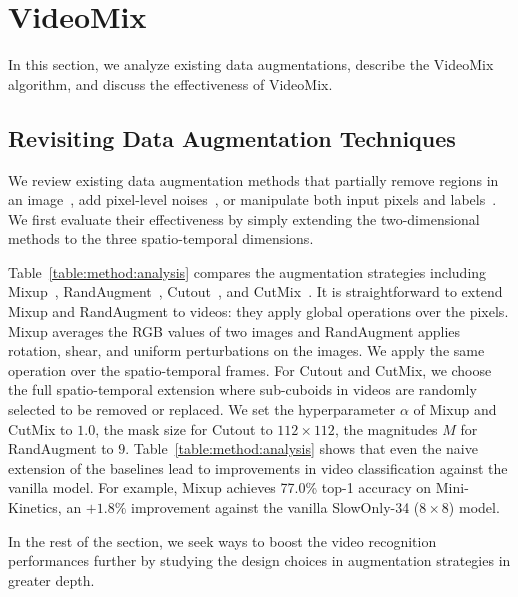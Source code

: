 \section{VideoMix}
\label{section:videomix}

In this section, we analyze existing data augmentations, describe the VideoMix algorithm, and discuss the effectiveness of VideoMix. 

\subsection{Revisiting Data Augmentation Techniques}



We review existing data augmentation methods that partially remove regions in an image~\cite{devries2017cutout}, add pixel-level noises~\cite{autoaugment,randaugment}, or manipulate both input pixels and labels~\cite{zhang2017mixup,cutmix}.
We first evaluate their effectiveness by simply extending the two-dimensional methods to the three spatio-temporal dimensions.

Table~\ref{table:method:analysis} compares the augmentation strategies including Mixup~\cite{zhang2017mixup}, RandAugment~\cite{randaugment}, Cutout~\cite{devries2017cutout}, and CutMix~\cite{cutmix}.
It is straightforward to extend Mixup and RandAugment to videos: they apply global operations over the pixels. Mixup averages the RGB values of two images and RandAugment applies rotation, shear, and uniform perturbations on the images. We apply the same operation over the spatio-temporal frames.
For Cutout and CutMix, we choose the full spatio-temporal extension where sub-cuboids in videos are randomly selected to be removed or replaced.
We set the hyperparameter $\alpha$ of Mixup and CutMix to $1.0$, the mask size for Cutout to $112\times112$, the magnitudes $M$ for RandAugment to $9$.
Table~\ref{table:method:analysis} shows that even the naive extension of the baselines lead to improvements in video classification against the vanilla model. For example, Mixup achieves 77.0\% top-1 accuracy on Mini-Kinetics, an $+\mathbf{1.8}\%$ improvement against the vanilla SlowOnly-34 ($8\times8$) model.

In the rest of the section, we seek ways to boost the video recognition performances further by studying the design choices in augmentation strategies in greater depth.


